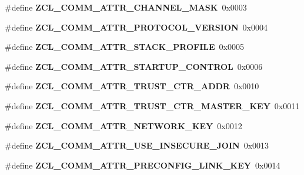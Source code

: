 \begin{DoxyCompactItemize}
\#define {\bfseries Z\+C\+L\+\_\+\+C\+O\+M\+M\+\_\+\+A\+T\+T\+R\+\_\+\+C\+H\+A\+N\+N\+E\+L\+\_\+\+M\+A\+SK}~0x0003
\item 
\mbox{\label{group__zcl__commissioning_ga0172ac434f01431ecc87395a87b129e7}} 
\#define {\bfseries Z\+C\+L\+\_\+\+C\+O\+M\+M\+\_\+\+A\+T\+T\+R\+\_\+\+P\+R\+O\+T\+O\+C\+O\+L\+\_\+\+V\+E\+R\+S\+I\+ON}~0x0004
\item 
\mbox{\label{group__zcl__commissioning_gad1b877a35188554b95bf9b2a89a57f8e}} 
\#define {\bfseries Z\+C\+L\+\_\+\+C\+O\+M\+M\+\_\+\+A\+T\+T\+R\+\_\+\+S\+T\+A\+C\+K\+\_\+\+P\+R\+O\+F\+I\+LE}~0x0005
\item 
\mbox{\label{group__zcl__commissioning_ga3fc4f9a3de48e3981e1a431fb890cfb6}} 
\#define {\bfseries Z\+C\+L\+\_\+\+C\+O\+M\+M\+\_\+\+A\+T\+T\+R\+\_\+\+S\+T\+A\+R\+T\+U\+P\+\_\+\+C\+O\+N\+T\+R\+OL}~0x0006
\item 
\mbox{\label{group__zcl__commissioning_ga2b419dd89f6e6772c5cdb61153e127ba}} 
\#define {\bfseries Z\+C\+L\+\_\+\+C\+O\+M\+M\+\_\+\+A\+T\+T\+R\+\_\+\+T\+R\+U\+S\+T\+\_\+\+C\+T\+R\+\_\+\+A\+D\+DR}~0x0010
\item 
\mbox{\label{group__zcl__commissioning_ga8f40f278173d0b1133f6696649bd4041}} 
\#define {\bfseries Z\+C\+L\+\_\+\+C\+O\+M\+M\+\_\+\+A\+T\+T\+R\+\_\+\+T\+R\+U\+S\+T\+\_\+\+C\+T\+R\+\_\+\+M\+A\+S\+T\+E\+R\+\_\+\+K\+EY}~0x0011
\item 
\mbox{\label{group__zcl__commissioning_gae25bcf9c8637bcc14c05fb30d6b4240e}} 
\#define {\bfseries Z\+C\+L\+\_\+\+C\+O\+M\+M\+\_\+\+A\+T\+T\+R\+\_\+\+N\+E\+T\+W\+O\+R\+K\+\_\+\+K\+EY}~0x0012
\item 
\mbox{\label{group__zcl__commissioning_gad50561cfc5d52d9a1efad90ef9599527}} 
\#define {\bfseries Z\+C\+L\+\_\+\+C\+O\+M\+M\+\_\+\+A\+T\+T\+R\+\_\+\+U\+S\+E\+\_\+\+I\+N\+S\+E\+C\+U\+R\+E\+\_\+\+J\+O\+IN}~0x0013
\item 
\mbox{\label{group__zcl__commissioning_gaf160e476884cd49d2155b236b2dc3c71}} 
\#define {\bfseries Z\+C\+L\+\_\+\+C\+O\+M\+M\+\_\+\+A\+T\+T\+R\+\_\+\+P\+R\+E\+C\+O\+N\+F\+I\+G\+\_\+\+L\+I\+N\+K\+\_\+\+K\+EY}~0x0014

\end{DoxyCompactItemize}

